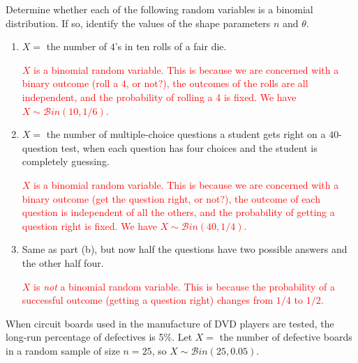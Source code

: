 \documentclass[12pt,reqno]{amsart}
\begin{document}
\bigskip

\prob Determine whether each of the following random variables is a binomial distribution. If so, identify the values of the shape parameters $n$ and $\theta$.

\medskip
\begin{enumerate}
\item $X=$ the number of $4$'s in ten rolls of a fair die.

\bigskip
\textcolor{red}{$X$ is a binomial random variable. This is because we are concerned with a binary outcome (roll a $4$, or not?), the outcomes of the rolls are all independent, and the probability of rolling a 4 is fixed. We have $X\sim \mathcal{B}in(10,1/6)$.}
\bigskip

\item $X=$ the number of multiple-choice questions a student gets right on a $40$-question test, when each question has four choices and the student is completely guessing.

\bigskip
\textcolor{red}{$X$ is a binomial random variable. This is because we are concerned with a binary outcome (get the question right, or not?), the outcome of each question is independent of all the others, and the probability of getting a question right is fixed. We have $X\sim \mathcal{B}in(40, 1/4)$.}
\bigskip

\item Same as part (b), but now half the questions have two possible answers and the other half four.

\bigskip
\textcolor{red}{$X$ is \textit{not} a binomial random variable. This is because the probability of a successful outcome (getting a question right) changes from $1/4$ to $1/2$.}
\end{enumerate}











\bigskip
\prob When circuit boards used in the manufacture of DVD players are tested, the long-run percentage of defectives is 5\%. Let $X =$ the number of defective boards in a random sample of size $n = 25$, so $X \sim \mathcal{B}in(25, 0.05)$.
\end{document}
